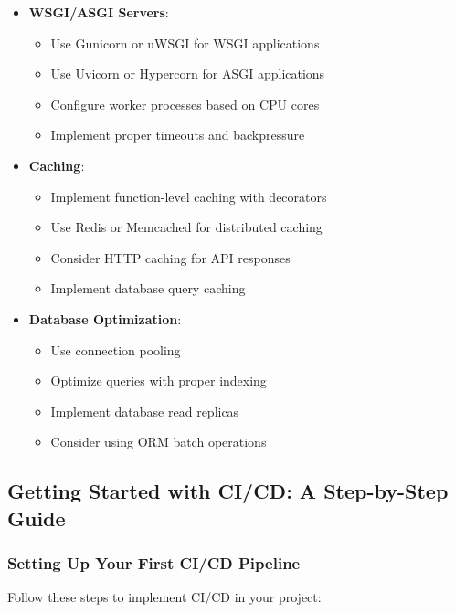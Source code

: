 \begin{itemize}
    \item \textbf{WSGI/ASGI Servers}:
    \begin{itemize}
        \item Use Gunicorn or uWSGI for WSGI applications
        \item Use Uvicorn or Hypercorn for ASGI applications
        \item Configure worker processes based on CPU cores
        \item Implement proper timeouts and backpressure
    \end{itemize}
    
    \item \textbf{Caching}:
    \begin{itemize}
        \item Implement function-level caching with decorators
        \item Use Redis or Memcached for distributed caching
        \item Consider HTTP caching for API responses
        \item Implement database query caching
    \end{itemize}
    
    \item \textbf{Database Optimization}:
    \begin{itemize}
        \item Use connection pooling
        \item Optimize queries with proper indexing
        \item Implement database read replicas
        \item Consider using ORM batch operations
    \end{itemize}
\end{itemize}

\subsection{Getting Started with CI/CD: A Step-by-Step Guide}

\subsubsection{Setting Up Your First CI/CD Pipeline}
Follow these steps to implement CI/CD in your project:

